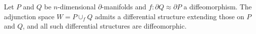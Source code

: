 Let $P$ and $Q$ be $n$-dimensional $\partial$-manifolds and $f: \partial Q \approx \partial P$ a diffeomorphism. The adjunction space $W = P \cup_f Q$ admits a differential structure extending those on $P$ and $Q$, and all such differential structures are diffeomorphic.
